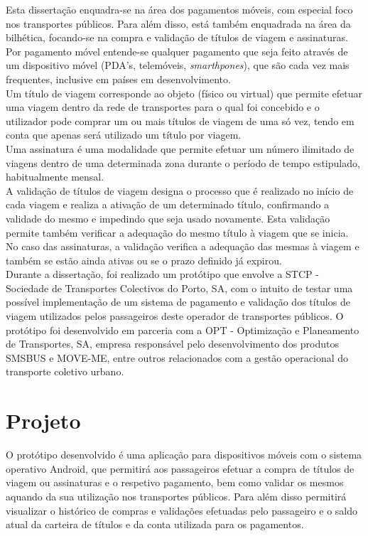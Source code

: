 Esta dissertação enquadra-se na área dos pagamentos móveis, com especial foco nos transportes públicos. Para além disso, está também enquadrada na área da bilhética, focando-se na compra e validação de títulos de viagem e assinaturas. 
\\Por pagamento móvel entende-se qualquer pagamento que seja feito através de um dispositivo móvel (PDA's, telemóveis, \textit{smarthpones}), que são cada vez mais frequentes, inclusive em países em desenvolvimento.\cite{Diniz2011}
\\Um título de viagem corresponde ao objeto (físico ou virtual) que permite efetuar uma viagem dentro da rede de transportes para o qual foi concebido e o utilizador pode comprar um ou mais títulos de viagem de uma só vez, tendo em conta que apenas será utilizado um título por viagem.
\\Uma assinatura é uma modalidade que permite efetuar um número ilimitado de viagens dentro de uma determinada zona durante o período de tempo estipulado, habitualmente mensal.
\\A validação de títulos de viagem designa o processo que é realizado no início de cada viagem e realiza a ativação de um determinado título, confirmando a validade do mesmo e impedindo que seja usado novamente. Esta validação permite também verificar a adequação do mesmo título à viagem que se inicia. No caso das assinaturas, a validação verifica a adequação das mesmas à viagem e também se estão ainda ativas ou se o prazo definido já expirou.
\\Durante a dissertação, foi realizado um protótipo que envolve a STCP - Sociedade de Transportes Colectivos do Porto, SA, com o intuito de testar uma possível implementação de um sistema de pagamento e validação dos títulos de viagem utilizados pelos passageiros deste operador de transportes públicos. O protótipo foi desenvolvido em parceria com a OPT -  Optimização e Planeamento de Transportes, SA, empresa responsável pelo desenvolvimento dos produtos SMSBUS e MOVE-ME, entre outros relacionados com a gestão operacional do transporte coletivo urbano. \cite{OPT}

\section{Projeto} \label{sec:proj}

O protótipo desenvolvido é uma aplicação para dispositivos móveis com o sistema operativo Android, que permitirá aos passageiros efetuar a compra de títulos de viagem ou assinaturas e o respetivo pagamento, bem como validar os mesmos aquando da sua utilização nos transportes públicos. Para além disso permitirá visualizar o histórico de compras e validações efetuadas pelo passageiro e o saldo atual da carteira de títulos e da conta utilizada para os pagamentos.

